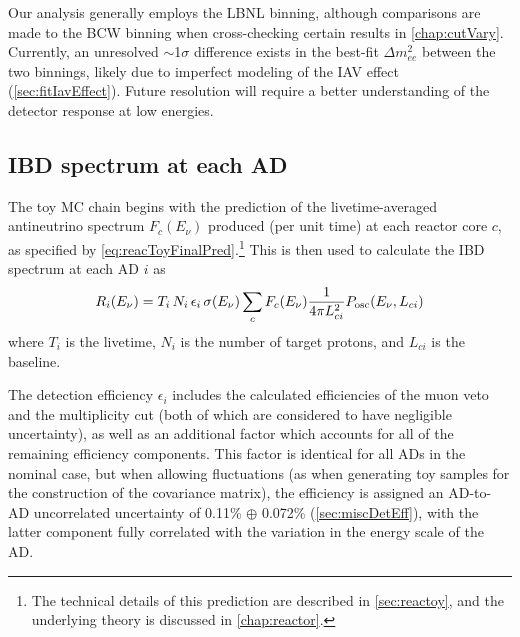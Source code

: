 \documentclass[../thesis.tex]{subfiles}
\begin{document}
Our analysis generally employs the LBNL binning, although comparisons are made to the BCW binning when cross-checking certain results in \autoref{chap:cutVary}.
 Currently, an unresolved $\sim$1$\sigma$ difference exists in the best-fit $\Delta m^2_{ee}$ between the two binnings, likely due to imperfect modeling of the IAV effect (\autoref{sec:fitIavEffect}). Future resolution will require a better understanding of the detector response at low energies.


\subsection{IBD spectrum at each AD}
\label{sec:fitToyFluxPred}

The toy MC chain begins with the prediction of the livetime-averaged antineutrino spectrum $F_c(E_\nu)$ produced (per unit time) at each reactor core $c$, as specified by \autoref{eq:reacToyFinalPred}.\footnote{The technical details of this prediction are described in \autoref{sec:reactoy}, and the underlying theory is discussed in \autoref{chap:reactor}.} This is then used to calculate the IBD spectrum at each AD $i$ as
\begin{equation}
  \label{eq:fitTrueIbdSpec}
  R_i(E_\nu) = T_i\,N_i\,\epsilon_i\,\sigma(E_\nu) \sum_c F_c(E_\nu) \frac{1}{4\pi L_{ci}^2}
  P_\mathrm{osc}(E_\nu, L_{ci})
\end{equation}
where $T_i$ is the livetime, $N_i$ is the number of target protons, and $L_{ci}$ is the baseline.

The detection efficiency $\epsilon_i$ includes the calculated efficiencies of the muon veto and the multiplicity cut (both of which are considered to have negligible uncertainty), as well as an additional factor which accounts for all of the remaining efficiency components. This factor is identical for all ADs in the nominal case, but when allowing fluctuations (as when generating toy samples for the construction of the covariance matrix), the efficiency is assigned an AD-to-AD uncorrelated uncertainty of 0.11\% $\oplus$ 0.072\% (\autoref{sec:miscDetEff}), with the latter component fully correlated with the variation in the energy scale of the AD.
\end{document}
